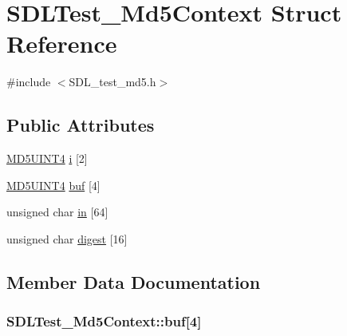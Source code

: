 \hypertarget{struct_s_d_l_test___md5_context}{}\section{S\+D\+L\+Test\+\_\+\+Md5\+Context Struct Reference}
\label{struct_s_d_l_test___md5_context}


{\ttfamily \#include $<$S\+D\+L\+\_\+test\+\_\+md5.\+h$>$}

\subsection*{Public Attributes}
\begin{DoxyCompactItemize}
\item 
\hyperlink{_s_d_l__test__md5_8h_a2bdcfd1b3373be8191c70eb4a7cb84c6}{M\+D5\+U\+I\+N\+T4} \hyperlink{struct_s_d_l_test___md5_context_a95b3d5fd74fd1b7a27bf96f3bb32beb4}{i} \mbox{[}2\mbox{]}
\item 
\hyperlink{_s_d_l__test__md5_8h_a2bdcfd1b3373be8191c70eb4a7cb84c6}{M\+D5\+U\+I\+N\+T4} \hyperlink{struct_s_d_l_test___md5_context_a061f0cead7ec49ac4c5baf0bbd9c13a7}{buf} \mbox{[}4\mbox{]}
\item 
unsigned char \hyperlink{struct_s_d_l_test___md5_context_a337638ef799dc0ad9397ea9b175ea388}{in} \mbox{[}64\mbox{]}
\item 
unsigned char \hyperlink{struct_s_d_l_test___md5_context_ab29079997a9f35e5d52c2aac3ad28f90}{digest} \mbox{[}16\mbox{]}
\end{DoxyCompactItemize}


\subsection{Member Data Documentation}
\subsubsection[{\texorpdfstring{buf}{buf}}]{ S\+D\+L\+Test\+\_\+\+Md5\+Context\+::buf\mbox{[}4\mbox{]}}\hypertarget{struct_s_d_l_test___md5_context_a061f0cead7ec49ac4c5baf0bbd9c13a7}{}\label{struct_s_d_l_test___md5_context_a061f0cead7ec49ac4c5baf0bbd9c13a7}
